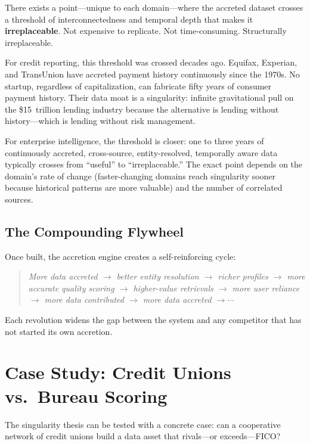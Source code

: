 \documentclass[11pt,twocolumn]{article}
\begin{document}
There exists a point---unique to each domain---where the accreted dataset crosses a threshold of interconnectedness and temporal depth that makes it \textbf{irreplaceable}. Not expensive to replicate. Not time-consuming. Structurally irreplaceable.

For credit reporting, this threshold was crossed decades ago. Equifax, Experian, and TransUnion have accreted payment history continuously since the 1970s. No startup, regardless of capitalization, can fabricate fifty years of consumer payment history. Their data moat is a singularity: infinite gravitational pull on the \$15~trillion lending industry because the alternative is lending without history---which is lending without risk management.

For enterprise intelligence, the threshold is closer: one to three years of continuously accreted, cross-source, entity-resolved, temporally aware data typically crosses from ``useful'' to ``irreplaceable.'' The exact point depends on the domain's rate of change (faster-changing domains reach singularity sooner because historical patterns are more valuable) and the number of correlated sources.

\subsection{The Compounding Flywheel}

Once built, the accretion engine creates a self-reinforcing cycle:

\begin{quote}
\small
\emph{More data accreted $\rightarrow$ better entity resolution $\rightarrow$ richer profiles $\rightarrow$ more accurate quality scoring $\rightarrow$ higher-value retrievals $\rightarrow$ more user reliance $\rightarrow$ more data contributed $\rightarrow$ more data accreted $\rightarrow \cdots$}
\end{quote}

Each revolution widens the gap between the system and any competitor that has not started its own accretion.

\section{Case Study: Credit Unions vs.\ Bureau Scoring}

The singularity thesis can be tested with a concrete case: can a cooperative network of credit unions build a data asset that rivals---or exceeds---FICO?
\end{document}
